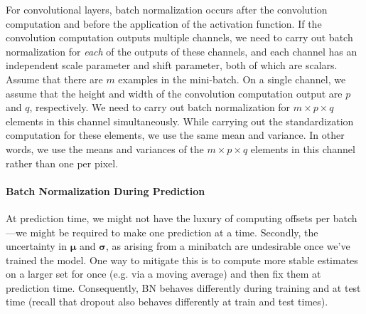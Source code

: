 For convolutional layers, batch normalization occurs after the convolution computation and before the application of the activation function. 
If the convolution computation outputs multiple channels, we need to carry out batch normalization for \textit{each} of the outputs of these channels, 
and each channel has an independent scale parameter and shift parameter, both of which are scalars. Assume that there are $m$ examples in the mini-batch. 
On a single channel, we assume that the height and width of the convolution computation output are $p$ and $q$, respectively. We need to carry out batch normalization for $m \times p \times q$ elements in this channel simultaneously. While carrying out the standardization computation for these elements, 
we use the same mean and variance. In other words, we use the means and variances of the $m \times p \times q$ elements in this channel rather than one per pixel.

\paragraph{Batch Normalization During Prediction}

At prediction time, we might not have the luxury of computing offsets per batch—we might be required to make one prediction at a time. Secondly, the uncertainty in $\mathbf{\mu}$ and $\mathbf{\sigma}$, as arising from a minibatch are undesirable once we've trained the model. One way to mitigate this is to compute more stable estimates on a larger set for once (e.g. via a moving average) and then fix them at prediction time. Consequently, BN behaves differently during training and at test time (recall that dropout also behaves differently at train and test times).





